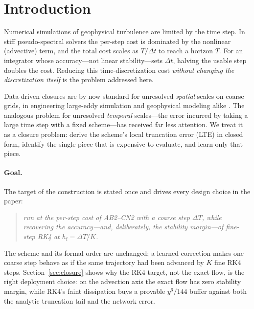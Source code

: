 \documentclass[11pt]{article}
\theoremstyle{plain}
\theoremstyle{definition}
\newcommand{\DT}{\Delta T}
\newcommand{\hf}{h_{\mathrm{f}}}
\begin{document}
\begin{abstract}
\smallskip
\noindent\textbf{Key words.} time-integration error, modified equation,
closure modeling, IMEX schemes, Wiener filtering, amplification-factor stability,
pseudo-spectral methods, quasi-geostrophic turbulence, scientific machine
learning
\end{abstract}

\section{Introduction}
\label{sec:intro}
Numerical simulations of geophysical turbulence are limited by the time step.
In stiff pseudo-spectral solvers the per-step cost is dominated by the
nonlinear (advective) term, and the total cost scales as $T/\Delta t$ to reach
a horizon $T$. For an integrator whose accuracy---not linear stability---sets
$\Delta t$, halving the usable step doubles the cost. Reducing this
time-discretization cost \emph{without changing the discretization itself} is
the problem addressed here.

Data-driven closures are by now standard for unresolved \emph{spatial} scales
on coarse grids, in engineering large-eddy simulation and geophysical modeling
alike \citep{gupta2021,guan2022,srinivasan2024}. The analogous problem for
unresolved \emph{temporal} scales---the error incurred by taking a large time
step with a fixed scheme---has received far less attention. We treat it as a
closure problem: derive the scheme's local truncation error (LTE) in closed
form, identify the single piece that is expensive to evaluate, and learn only
that piece.

\paragraph{Goal.}
The target of the construction is stated once and drives every design choice
in the paper:
\begin{quote}\itshape
run at the per-step cost of AB2--CN2 with a coarse step $\DT$, while
recovering the accuracy---and, deliberately, the stability margin---of
fine-step RK4 at $\hf=\DT/K$.
\end{quote}
The scheme and its formal order are unchanged; a learned correction makes one
coarse step behave as if the same trajectory had been advanced by $K$ fine RK4
steps. Section~\ref{sec:closure} shows why the RK4 target, not the exact flow, is the
right deployment choice: on the advection axis the exact flow has zero
stability margin, while RK4's faint dissipation buys a provable $y^6/144$
buffer against both the analytic truncation tail and the network error.
\end{document}
